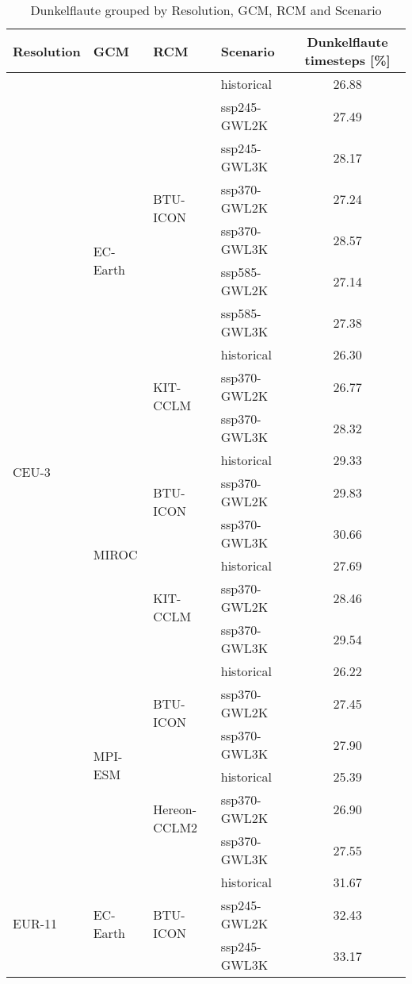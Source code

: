 \begin{table}[!htbp]
\centering
\footnotesize
\caption{Dunkelflaute grouped by Resolution, GCM, RCM and Scenario}
\label{Table:Dunkelflaute_changes}
\begin{tabular}{lll|l|c}
\toprule
Resolution & GCM & RCM & Scenario & Dunkelflaute timesteps [\%] \\
\midrule
\multirow{22}{*}{CEU-3} & \multirow{10}{*}{EC-Earth} & \multirow{7}{*}{BTU-ICON} & historical & 26.88 \\
 &  &  & ssp245-GWL2K & 27.49 \\
 &  &  & ssp245-GWL3K & 28.17 \\
 &  &  & ssp370-GWL2K & 27.24 \\
 &  &  & ssp370-GWL3K & 28.57 \\
 &  &  & ssp585-GWL2K & 27.14 \\
 &  &  & ssp585-GWL3K & 27.38 \\
\cmidrule(lr){3-5}
 &  & \multirow{3}{*}{KIT-CCLM} & historical & 26.30 \\
 &  &  & ssp370-GWL2K & 26.77 \\
 &  &  & ssp370-GWL3K & 28.32 \\
\cmidrule(lr){3-5}
\cmidrule(lr){2-5}
 & \multirow{6}{*}{MIROC} & \multirow{3}{*}{BTU-ICON} & historical & 29.33 \\
 &  &  & ssp370-GWL2K & 29.83 \\
 &  &  & ssp370-GWL3K & 30.66 \\
\cmidrule(lr){3-5}
 &  & \multirow{3}{*}{KIT-CCLM} & historical & 27.69 \\
 &  &  & ssp370-GWL2K & 28.46 \\
 &  &  & ssp370-GWL3K & 29.54 \\
\cmidrule(lr){3-5}
\cmidrule(lr){2-5}
 & \multirow{6}{*}{MPI-ESM} & \multirow{3}{*}{BTU-ICON} & historical & 26.22 \\
 &  &  & ssp370-GWL2K & 27.45 \\
 &  &  & ssp370-GWL3K & 27.90 \\
\cmidrule(lr){3-5}
 &  & \multirow{3}{*}{Hereon-CCLM2} & historical & 25.39 \\
 &  &  & ssp370-GWL2K & 26.90 \\
 &  &  & ssp370-GWL3K & 27.55 \\
\midrule
\multirow{22}{*}{EUR-11} & \multirow{10}{*}{EC-Earth} & \multirow{7}{*}{BTU-ICON} & historical & 31.67 \\
 &  &  & ssp245-GWL2K & 32.43 \\
 &  &  & ssp245-GWL3K & 33.17 \\

\end{tabular}
\end{table}

